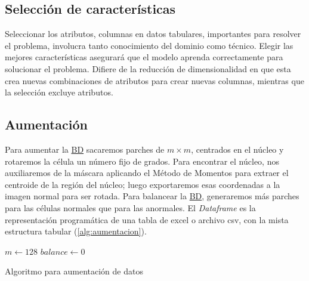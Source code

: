 \subsection{Selección de características}

Seleccionar los atributos, columnas en datos tabulares, importantes para
resolver el problema, involucra tanto conocimiento del dominio como técnico.
Elegir las mejores características asegurará que el modelo aprenda correctamente
para solucionar el problema. Difiere de la reducción de dimensionalidad en que
esta crea nuevas combinaciones de atributos para crear nuevas columnas, mientras
que la selección excluye atributos.

\subsection{Aumentación}

Para aumentar la \hyperlink{abbr}{BD} sacaremos parches de $m \times m$,
centrados en el núcleo y rotaremos la célula un número fijo de grados. Para
encontrar el núcleo, nos auxiliaremos de la máscara aplicando el Método de
Momentos para extraer el centroide de la región del núcleo; luego exportaremos
esas coordenadas a la imagen normal para ser rotada. Para balancear la
\hyperlink{abbr}{BD}, generaremos más parches para las células normales que para
las anormales. El \emph{Dataframe} es la representación programática de una
tabla de excel o archivo csv, con la mista estructura tabular
(\autoref{alg:aumentacion}). 

\begin{algorithm}[H]
    \SetAlgoLined
    $m \longleftarrow 128$
    \BlankLine
    $balance \longleftarrow 0$
    \BlankLine
    \caption{Algoritmo para aumentación de datos}\label{alg:aumentacion}
\end{algorithm}

